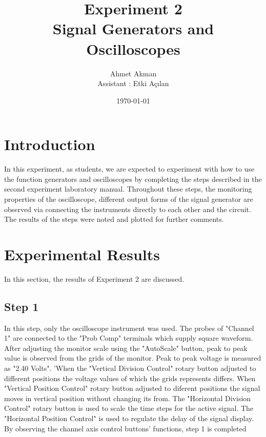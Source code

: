 \documentclass[letterpaper,12pt]{article}
\begin{document}
\title{Experiment 2 \protect\\Signal Generators and Oscilloscopes}
\author{Ahmet Akman \protect\\ Assistant : Etki Açılan}
\date{\today}
\maketitle



\section{Introduction} 
In this experiment, as students, we are expected to experiment with how to use the function generators and oscilloscopes by completing the steps described in the second experiment laboratory manual. Throughout these steps, the monitoring properties of the oscilloscope, different output forms of the signal generator are observed via connecting the instruments directly to each other and the circuit. The results of the steps were noted and plotted for further comments.

\section{Experimental Results}
In this section, the results of Experiment 2 are discussed.
\subsection{Step 1}
In this step, only the oscilloscope instrument was used. The probes of "Channel 1" are connected to the "Prob Comp" terminals which supply square waveform. After adjusting the monitor scale using the "AutoScale" button, peak to peak value is observed from the grids of the monitor. Peak to peak voltage is measured as "2.40 Volts". 'When the "Vertical Division Control" rotary button adjusted to different positions the voltage values of which the grids represents differs. When "Vertical Position Control" rotary button adjusted to diferent positions the signal moves in vertical position without changing its from. The "Horizontal Division Control" rotary button is used to scale the time steps for the active signal. The "Horizontal Position Control" is used to regulate the delay of the signal display. By observing the channel axis control buttons' functions, step 1 is completed
\end{document}
